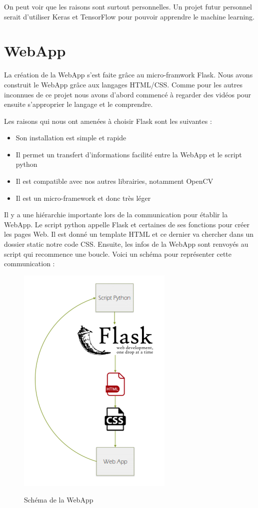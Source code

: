 \documentclass[
	a4paper,									%
	11pt,										%
	twoside,									%
	openright,									%
	notitlepage,									%
	parskip=half,								%
]{scrreprt}										%
\begin{document}
On peut voir que les raisons sont surtout personnelles. Un projet futur personnel serait d'utiliser Keras et TensorFlow
pour pouvoir apprendre le machine learning. \par

\section{WebApp}

La création de la WebApp s'est faite grâce au micro-framwork Flask. Nous avons construit le WebApp grâce aux langages 
HTML/CSS. Comme pour les autres inconnues de ce projet nous avons d'abord commencé à regarder des vidéos pour ensuite
s'approprier le langage et le comprendre. \par

Les raisons qui nous ont amenées à choisir Flask sont les suivantes : 

\begin{itemize}
	\item Son installation est simple et rapide 
	\item Il permet un transfert d'informations facilité entre la WebApp et le script python
	\item Il est compatible avec nos autres librairies, notamment OpenCV
	\item Il est un micro-framework et donc très léger
\end{itemize}

Il y a une hiérarchie importante lors de la communication pour établir la WebApp. Le script python appelle Flask et certaines 
de ses fonctions pour créer les pages Web. Il est donné un template HTML et ce dernier va chercher dans un dossier static 
notre code CSS. Ensuite, les infos de la WebApp sont renvoyés au script qui recommence une boucle. 
Voici un schéma pour représenter cette communication : 

\begin{figure}[!h]
	\centering
	\includegraphics[scale=.8]{img/Schema_WebApp.png}
	\label{WebApp}
	\caption{Schéma de la WebApp}
\end{figure}
\end{document}

